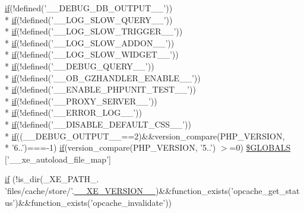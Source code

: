 \begin{DoxyCompactItemize}
\hyperlink{index_8php_a89c9c4ffebb12a316e28d000a981cf89}{if}(!defined('\-\_\-\-\_\-\-D\-E\-B\-U\-G\-\_\-\-D\-B\-\_\-\-O\-U\-T\-P\-U\-T\-\_\-\-\_\-')) \\*
\hyperlink{index_8php_a89c9c4ffebb12a316e28d000a981cf89}{if}(!defined('\-\_\-\-\_\-\-L\-O\-G\-\_\-\-S\-L\-O\-W\-\_\-\-Q\-U\-E\-R\-Y\-\_\-\-\_\-')) \\*
\hyperlink{index_8php_a89c9c4ffebb12a316e28d000a981cf89}{if}(!defined('\-\_\-\-\_\-\-L\-O\-G\-\_\-\-S\-L\-O\-W\-\_\-\-T\-R\-I\-G\-G\-E\-R\-\_\-\-\_\-')) \\*
\hyperlink{index_8php_a89c9c4ffebb12a316e28d000a981cf89}{if}(!defined('\-\_\-\-\_\-\-L\-O\-G\-\_\-\-S\-L\-O\-W\-\_\-\-A\-D\-D\-O\-N\-\_\-\-\_\-')) \\*
\hyperlink{index_8php_a89c9c4ffebb12a316e28d000a981cf89}{if}(!defined('\-\_\-\-\_\-\-L\-O\-G\-\_\-\-S\-L\-O\-W\-\_\-\-W\-I\-D\-G\-E\-T\-\_\-\-\_\-')) \\*
\hyperlink{index_8php_a89c9c4ffebb12a316e28d000a981cf89}{if}(!defined('\-\_\-\-\_\-\-D\-E\-B\-U\-G\-\_\-\-Q\-U\-E\-R\-Y\-\_\-\-\_\-')) \\*
\hyperlink{index_8php_a89c9c4ffebb12a316e28d000a981cf89}{if}(!defined('\-\_\-\-\_\-\-O\-B\-\_\-\-G\-Z\-H\-A\-N\-D\-L\-E\-R\-\_\-\-E\-N\-A\-B\-L\-E\-\_\-\-\_\-')) \\*
\hyperlink{index_8php_a89c9c4ffebb12a316e28d000a981cf89}{if}(!defined('\-\_\-\-\_\-\-E\-N\-A\-B\-L\-E\-\_\-\-P\-H\-P\-U\-N\-I\-T\-\_\-\-T\-E\-S\-T\-\_\-\-\_\-')) \\*
\hyperlink{index_8php_a89c9c4ffebb12a316e28d000a981cf89}{if}(!defined('\-\_\-\-\_\-\-P\-R\-O\-X\-Y\-\_\-\-S\-E\-R\-V\-E\-R\-\_\-\-\_\-')) \\*
\hyperlink{index_8php_a89c9c4ffebb12a316e28d000a981cf89}{if}(!defined('\-\_\-\-\_\-\-E\-R\-R\-O\-R\-\_\-\-L\-O\-G\-\_\-\-\_\-')) \\*
\hyperlink{index_8php_a89c9c4ffebb12a316e28d000a981cf89}{if}(!defined('\-\_\-\-\_\-\-D\-I\-S\-A\-B\-L\-E\-\_\-\-D\-E\-F\-A\-U\-L\-T\-\_\-\-C\-S\-S\-\_\-\-\_\-')) \\*
\hyperlink{index_8php_a89c9c4ffebb12a316e28d000a981cf89}{if}((\-\_\-\-\_\-\-D\-E\-B\-U\-G\-\_\-\-O\-U\-T\-P\-U\-T\-\_\-\-\_\-==2)\&\&version\-\_\-compare(P\-H\-P\-\_\-\-V\-E\-R\-S\-I\-O\-N, \\*
'6..')===-\/1) \hyperlink{index_8php_a89c9c4ffebb12a316e28d000a981cf89}{if}(version\-\_\-compare(P\-H\-P\-\_\-\-V\-E\-R\-S\-I\-O\-N, '5..') $>$=0) \hyperlink{config_8inc_8php_a38f1c3c542a43174a268208f45dca44e}{\$\-G\-L\-O\-B\-A\-L\-S} \mbox{[}'\-\_\-\-\_\-xe\-\_\-autoload\-\_\-file\-\_\-map'\mbox{]}
\item 
\hyperlink{config_8inc_8php_ad290f1de8a298a2010bf8bafc4e86c0a}{if} (!is\-\_\-dir(\-\_\-\-X\-E\-\_\-\-P\-A\-T\-H\-\_\-. 'files/cache/store/'.\hyperlink{config_8inc_8php_afceaaec30d0e5b6a78d0ae28bcbfc8f3}{\-\_\-\-\_\-\-X\-E\-\_\-\-V\-E\-R\-S\-I\-O\-N\-\_\-\-\_\-})\&\&function\-\_\-exists('opcache\-\_\-get\-\_\-status')\&\&function\-\_\-exists('opcache\-\_\-invalidate'))
\end{DoxyCompactItemize}


